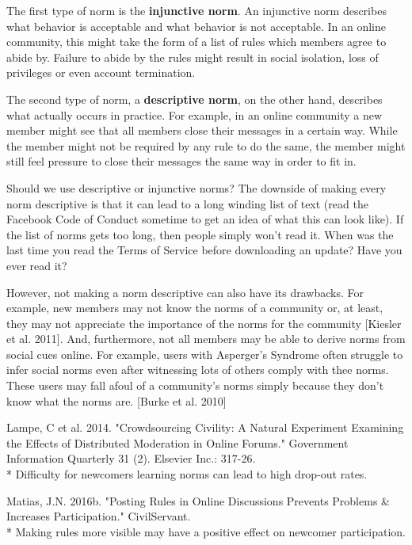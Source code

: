 \documentclass[class=book, crop=false]{standalone}
\providecommand{\keyterm}[1]{\textbf{#1}\marginnote{\scriptsize \textbf{#1}}}
\begin{document}
The first type of norm is the \keyterm{injunctive norm}. An injunctive norm describes what behavior is acceptable and what behavior is not acceptable. In an online community, this might take the form of a list of rules which members agree to abide by. Failure to abide by the rules might result in social isolation, loss of privileges or even account termination.

The second type of norm, a \keyterm{descriptive norm}, on the other hand, describes what actually occurs in practice. For example, in an online community a new member might see that all members close their messages in a certain way. While the member might not be required by any rule to do the same, the member might still feel pressure to close their messages the same way in order to fit in.

Should we use descriptive or injunctive norms? The downside of making every norm descriptive is that it can lead to a long winding list of text (read the Facebook Code of Conduct sometime to get an idea of what this can look like). If the list of norms gets too long, then people simply won't read it. When was the last time you read the Terms of Service before downloading an update? Have you ever read it?

However, not making a norm descriptive can also have its drawbacks. For example, new members may not know the norms of a community or, at least, they may not appreciate the importance of the norms for the community [Kiesler et al. 2011]. And, furthermore, not all members may be able to derive norms from social cues online. For example, users with Asperger's Syndrome often struggle to infer social norms even after witnessing lots of others comply with thee norms. These users may fall afoul of a community's norms simply because they don't know what the norms are. [Burke et al. 2010]

Lampe, C et al. 2014. "Crowdsourcing Civility: A Natural Experiment Examining the Effects of Distributed Moderation in Online Forums." Government Information Quarterly 31 (2). Elsevier Inc.: 317-26.\\
 * Difficulty for newcomers learning norms can lead to high drop-out rates.

Matias, J.N. 2016b. "Posting Rules in Online Discussions Prevents Problems \& Increases Participation." CivilServant.\\
 * Making rules more visible may have a positive effect on newcomer participation.
\end{document}

